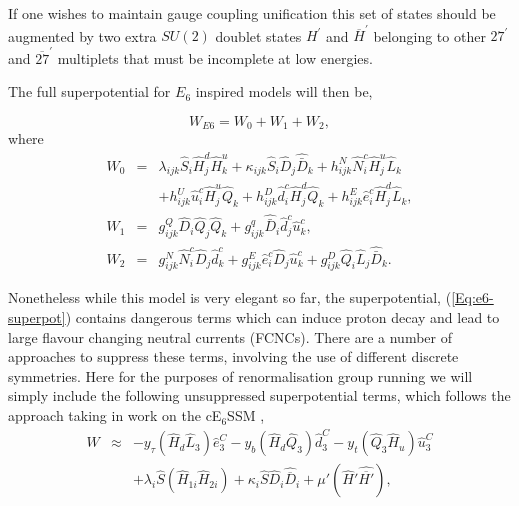 \documentclass[preprint,amsmath,amssymb,aps,superscriptaddress,prd,showpacs,floatfix,nofootinbib]{revtex4-1}
\newcommand{\be}{\begin{equation}}
\newcommand{\ee}{\end{equation}}
\newcommand{\ba}{\begin{eqnarray}}
\newcommand{\ea}{\end{eqnarray}}
\newcommand{\SuperField}[1]{\hat{#1}}
\begin{document}
If one wishes to maintain gauge coupling unification this set of
states should be augmented by two extra $SU(2)$ doublet states
$H^\prime$ and $\overline{H}^\prime$ belonging to other $27^\prime$
and $\overline{27}^\prime$ multiplets that must be incomplete at low
energies.

The full superpotential for $E_6$ inspired models will then be,

\be
W_{E6} = W_0 + W_1 + W_2,
\label{Eq:e6-superpot}
\ee where
\begin{eqnarray}
W_0 &=& \lambda_{ijk} \hat{S}_i \hat{H}^d_{j} \hat{H}^u_{k} + \kappa_{ijk} \hat{S}_i \hat{D}_j \hat{\bar{D}}_k + h^N_{ijk} \hat{N}^c_i \hat{H}^u_{j} \hat{L}_k \nonumber \\
& & + h^U_{ijk} \hat{u}^c_i \hat{H}^u_{j} \hat{Q}_k + h^D_{ijk} \hat{d}^c_i \hat{H}^d_{j} \hat{Q}_k + h^E_{ijk} \hat{e}^c_i \hat{H}^d_{j} \hat{L}_k, \\
W_1 &=& g^Q_{ijk} \hat{D}_i \hat{Q}_j \hat{Q}_k + g^q_{ijk} \hat{\bar{D}}_i \hat{d}^c_j \hat{u}^c_k, \\
W_2 &=& g^N_{ijk} \hat{N}^c_i \hat{D}_j \hat{d}^c_k + g^E_{ijk} \hat{e}^c_i \hat{D}_j \hat{u}^c_k + g^D_{ijk} \hat{Q}_i \hat{L}_j \hat{\bar{D}}_k.
\label{Eq:e6-superpot-parts}
\end{eqnarray}

Nonetheless while this model is very elegant so far, the
superpotential, (\ref{Eq:e6-superpot}) contains dangerous terms which
can induce proton decay and lead to large flavour changing neutral
currents (FCNCs).  There are a number of approaches to suppress these
terms, involving the use of different discrete symmetries.  Here for
the purposes of renormalisation group running we will simply include
the following unsuppressed superpotential terms, which follows the
approach taking in work on the cE$_6$SSM \cite{Athron:2009ue,
  Athron:2009bs},
%
    \ba
    W &\approx& - y_{\tau} (\SuperField{H}_d
    \SuperField{L}_3) \SuperField{e}^C_3 - y_b (\SuperField{H}_d
    \SuperField{Q}_3) \SuperField{d}_3^C - y_t (\SuperField{Q}_3
    \SuperField{H}_u) \SuperField{u}_3^C\\
    &&
    + \lambda_i \SuperField{S} (\SuperField{H}_{1i}
    \SuperField{H}_{2i}) + \kappa_i \SuperField{S} \SuperField{D}_i
    \SuperField{\overline{D}}_i + \mu' (\SuperField{H}'
    \SuperField{\overline{H'}}),
    \ea
  \label{SuPot_RGE}
%  
\end{document}
